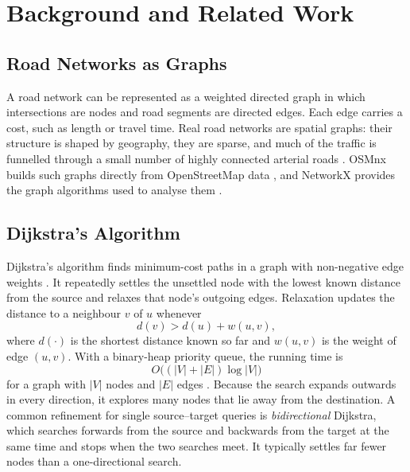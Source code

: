 \documentclass[12pt]{report}
\begin{document}

\chapter{Background and Related Work}
\label{ch:background}

\section{Road Networks as Graphs}

A road network can be represented as a weighted directed graph in which intersections are nodes and road segments are directed edges. Each edge carries a cost, such as length or travel time. Real road networks are spatial graphs: their structure is shaped by geography, they are sparse, and much of the traffic is funnelled through a small number of highly connected arterial roads \citep{barthelemy2011spatial}. OSMnx builds such graphs directly from OpenStreetMap data \citep{boeing2017osmnx}, and NetworkX provides the graph algorithms used to analyse them \citep{hagberg2008networkx}.

\section{Dijkstra's Algorithm}

Dijkstra's algorithm finds minimum-cost paths in a graph with non-negative edge weights \citep{dijkstra1959}. It repeatedly settles the unsettled node with the lowest known distance from the source and relaxes that node's outgoing edges. Relaxation updates the distance to a neighbour $v$ of $u$ whenever
\begin{equation}
d(v) > d(u) + w(u,v),
\label{eq:relax}
\end{equation}
where $d(\cdot)$ is the shortest distance known so far and $w(u,v)$ is the weight of edge $(u,v)$. With a binary-heap priority queue, the running time is
\begin{equation}
O\big((|V| + |E|)\log |V|\big)
\end{equation}
for a graph with $|V|$ nodes and $|E|$ edges \citep{cormen2009algorithms}. Because the search expands outwards in every direction, it explores many nodes that lie away from the destination. A common refinement for single source--target queries is \emph{bidirectional} Dijkstra, which searches forwards from the source and backwards from the target at the same time and stops when the two searches meet. It typically settles far fewer nodes than a one-directional search.
\end{document}
